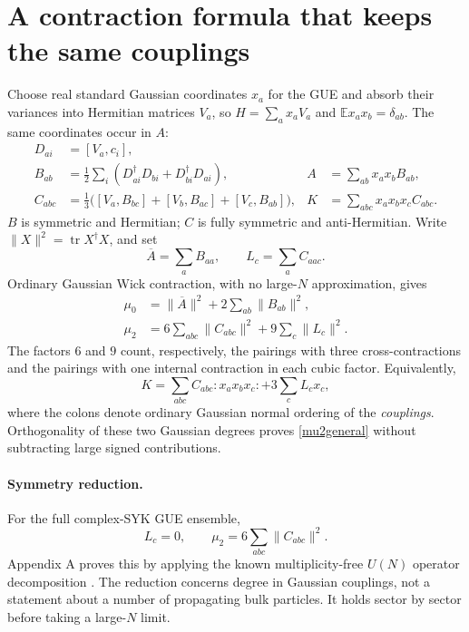 \documentclass[11pt,a4paper]{article}
\newcommand{\tr}{\operatorname{tr}}
\newcommand{\E}{\mathbb E}
\begin{document}
\newpage
\section{A contraction formula that keeps the same couplings}
Choose real standard Gaussian coordinates $x_a$ for the GUE and absorb
their variances into Hermitian matrices $V_a$, so $H=\sum_a x_aV_a$ and
$\E x_ax_b=\delta_{ab}$. The same coordinates occur in $A$:
\begin{align}
 D_{ai}&=[V_a,c_i],\\
 B_{ab}&=\frac12\sum_i(D_{ai}^\dagger D_{bi}+D_{bi}^\dagger D_{ai}),
 & A&=\sum_{ab}x_ax_bB_{ab},\\
 C_{abc}&=\frac13\bigl([V_a,B_{bc}]+[V_b,B_{ac}]+[V_c,B_{ab}]\bigr),
 & K&=\sum_{abc}x_ax_bx_c C_{abc}.
\end{align}
$B$ is symmetric and Hermitian; $C$ is fully symmetric and
anti-Hermitian. Write $\|X\|^2=\tr X^\dagger X$, and set
\begin{equation}
 \overline A=\sum_a B_{aa},\qquad L_c=\sum_a C_{aac}.
\end{equation}
Ordinary Gaussian Wick contraction, with no large-$N$ approximation, gives
\begin{align}
 \mu_0&=\|\overline A\|^2+2\sum_{ab}\|B_{ab}\|^2,\label{mu0}\\
 \mu_2&=6\sum_{abc}\|C_{abc}\|^2+9\sum_c\|L_c\|^2.\label{mu2general}
\end{align}
The factors $6$ and $9$ count, respectively, the pairings with three
cross-contractions and the pairings with one internal contraction in each
cubic factor. Equivalently,
\begin{equation}
 K=\sum_{abc}C_{abc}:x_ax_bx_c:+3\sum_cL_cx_c,
\end{equation}
where the colons denote ordinary Gaussian normal ordering of the
\emph{couplings}. Orthogonality of these two Gaussian degrees proves
\eqref{mu2general} without subtracting large signed contributions.

\paragraph{Symmetry reduction.}
For the full complex-SYK GUE ensemble,
\begin{equation}
 \boxed{L_c=0,\qquad \mu_2=6\sum_{abc}\|C_{abc}\|^2.}\label{reduction}
\end{equation}
Appendix A proves this by applying the known multiplicity-free $U(N)$
operator decomposition \cite{kota}. The reduction concerns degree in
Gaussian couplings, not a statement about a number of propagating bulk
particles. It holds sector by sector before taking a large-$N$ limit.
\end{document}
